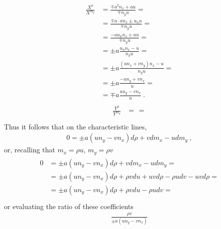 \documentclass[letterpaper,10pt,english]{jupyterBook}
\begin{document}
\begin{equation*}
\begin{split}\begin{aligned}
  \frac{X^{\rho}}{X^{m_y}}
  & = \frac{\mp a^2 n_x + a u}{\mp n_y u} = \\
  & = \frac{\mp a \cdot a n_x \pm u_n u}{\mp n_y u} = \\
  & = \frac{ -  a u_n n_x + a u}{\mp n_y u} = \\
  & = \pm a \frac{ u_n n_x - u}{ n_y u} = \\
  & = \pm a \frac{ ( u n_x + v n_y ) n_x - u}{ n_y u } = \\
  & = \pm a \frac{ - u n_y + v n_x }{ u } = \\
  & = \mp a \frac{ u n_y - v n_x }{ u } \ .
\end{aligned}\end{split}
\end{equation*}\begin{equation*}
\begin{split}\begin{aligned}
  \frac{Y^{\rho}}{Y^{m_y}}
  & = \frac{}{} = \\
\end{aligned}\end{split}
\end{equation*}
\sphinxAtStartPar
Thus it follows that on the characteristic lines,
\begin{equation*}
\begin{split}0 = \pm a ( u n_y - v n_x ) d \rho + v d m_x - u d m_y \ ,\end{split}
\end{equation*}
\sphinxAtStartPar
or, recalling that \(m_x = \rho u\), \(m_y = \rho v\)
\begin{equation*}
\begin{split}\begin{aligned}
  0 
  & = \pm a ( u n_y - v n_x ) d \rho + v d m_x - u d m_y = \\
  & = \pm a ( u n_y - v n_x ) d \rho + \rho v d u + uv d \rho - \rho u d v - uv d \rho = \\
  & = \pm a ( u n_y - v n_x ) d \rho + \rho v d u - \rho u d v  = \\
\end{aligned}\end{split}
\end{equation*}
\sphinxAtStartPar
or evaluating the ratio of these coefficients
\begin{equation*}
\begin{split}\frac{\rho v}{\pm a ( u n_y - v n_x )}\end{split}
\end{equation*}
\sphinxAtStartPar
{} 
\end{document}
